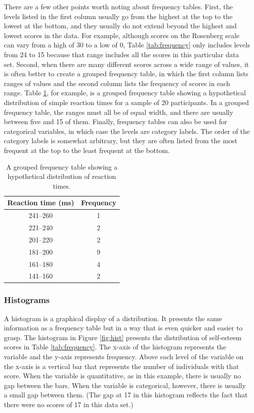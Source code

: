 \documentclass[
]{krantz}
\begin{document}
There are a few other points worth noting about frequency tables. First, the levels listed in the first column usually go from the highest at the top to the lowest at the bottom, and they usually do not extend beyond the highest and lowest scores in the data. For example, although scores on the Rosenberg scale can vary from a high of 30 to a low of 0, Table \ref{tab:frequency} only includes levels from 24 to 15 because that range includes all the scores in this particular data set. Second, when there are many different scores across a wide range of values, it is often better to create a grouped frequency table, in which the first column lists ranges of values and the second column lists the frequency of scores in each range. Table \ref{tab:frequencybin}, for example, is a grouped frequency table showing a hypothetical distribution of simple reaction times for a sample of 20 participants. In a grouped frequency table, the ranges must all be of equal width, and there are usually between five and 15 of them. Finally, frequency tables can also be used for categorical variables, in which case the levels are category labels. The order of the category labels is somewhat arbitrary, but they are often listed from the most frequent at the top to the least frequent at the bottom.

\begin{table}

\caption{\label{tab:frequencybin}A grouped frequency table showing a hypothetical distribution of reaction times.}
\centering
\begin{tabular}[t]{c|c}
\hline
Reaction time (ms) & Frequency\\
\hline
241–260 & 1\\
\hline
221–240 & 2\\
\hline
201–220 & 2\\
\hline
181–200 & 9\\
\hline
161–180 & 4\\
\hline
141–160 & 2\\
\hline
\end{tabular}
\end{table}

\subsubsection*{Histograms}\label{histograms}


A histogram is a graphical display of a distribution. It presents the same information as a frequency table but in a way that is even quicker and easier to grasp. The histogram in Figure \ref{fig:hist} presents the distribution of self-esteem scores in Table \ref{tab:frequency}. The x-axis of the histogram represents the variable and the y-axis represents frequency. Above each level of the variable on the x-axis is a vertical bar that represents the number of individuals with that score. When the variable is quantitative, as in this example, there is usually no gap between the bars. When the variable is categorical, however, there is usually a small gap between them. (The gap at 17 in this histogram reflects the fact that there were no scores of 17 in this data set.)
\end{document}
